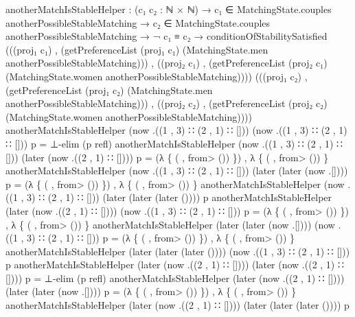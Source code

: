 \documentclass{article}
\begin{document}
\begin{code}
{anotherMatchIsStableHelper : (c₁ c₂ : ℕ × ℕ) →
      c₁ ∈ MatchingState.couples anotherPossibleStableMatching →
      c₂ ∈ MatchingState.couples anotherPossibleStableMatching →
      ¬ c₁ ≡ c₂ →
      conditionOfStabilitySatisfied
      (((proj₁ c₁) , (getPreferenceList (proj₁ c₁) (MatchingState.men anotherPossibleStableMatching))) , ((proj₂ c₁) , (getPreferenceList (proj₂ c₁) (MatchingState.women anotherPossibleStableMatching))))
      (((proj₁ c₂) , (getPreferenceList (proj₁ c₂) (MatchingState.men anotherPossibleStableMatching))) , ((proj₂ c₂) , (getPreferenceList (proj₂ c₂) (MatchingState.women anotherPossibleStableMatching))))
anotherMatchIsStableHelper \AgdaUnderscore{} \AgdaUnderscore{} (now .((1 , 3) ∷ (2 , 1) ∷ [])) (now .((1 , 3) ∷ (2 , 1) ∷ [])) p = ⊥-elim (p refl)
anotherMatchIsStableHelper \AgdaUnderscore{} \AgdaUnderscore{} (now .((1 , 3) ∷ (2 , 1) ∷ [])) (later (now .((2 , 1) ∷ []))) p = (λ \{ (\AgdaUnderscore{} , \AgdaUnderscore{}from>\AgdaUnderscore{} ()) \}) , λ \{ (\AgdaUnderscore{} , \AgdaUnderscore{}from>\AgdaUnderscore{} ()) \}
anotherMatchIsStableHelper \AgdaUnderscore{} \AgdaUnderscore{} (now .((1 , 3) ∷ (2 , 1) ∷ [])) (later (later (now .[]))) p = (λ \{ (\AgdaUnderscore{} , \AgdaUnderscore{}from>\AgdaUnderscore{} ()) \}) , λ \{ (\AgdaUnderscore{} , \AgdaUnderscore{}from>\AgdaUnderscore{} ()) \}
anotherMatchIsStableHelper \AgdaUnderscore{} \AgdaUnderscore{} (now .((1 , 3) ∷ (2 , 1) ∷ [])) (later (later (later ()))) p
anotherMatchIsStableHelper \AgdaUnderscore{} \AgdaUnderscore{} (later (now .((2 , 1) ∷ []))) (now .((1 , 3) ∷ (2 , 1) ∷ [])) p = (λ \{ (\AgdaUnderscore{} , \AgdaUnderscore{}from>\AgdaUnderscore{} ()) \}) , λ \{ (\AgdaUnderscore{} , \AgdaUnderscore{}from>\AgdaUnderscore{} ()) \} 
anotherMatchIsStableHelper \AgdaUnderscore{} \AgdaUnderscore{} (later (later (now .[]))) (now .((1 , 3) ∷ (2 , 1) ∷ [])) p = (λ \{ (\AgdaUnderscore{} , \AgdaUnderscore{}from>\AgdaUnderscore{} ()) \}) , λ \{ (\AgdaUnderscore{} , \AgdaUnderscore{}from>\AgdaUnderscore{} ()) \}
anotherMatchIsStableHelper \AgdaUnderscore{} \AgdaUnderscore{} (later (later (later ()))) (now .((1 , 3) ∷ (2 , 1) ∷ [])) p
anotherMatchIsStableHelper \AgdaUnderscore{} \AgdaUnderscore{} (later (now .((2 , 1) ∷ []))) (later (now .((2 , 1) ∷ []))) p = ⊥-elim (p refl)
anotherMatchIsStableHelper \AgdaUnderscore{} \AgdaUnderscore{} (later (now .((2 , 1) ∷ []))) (later (later (now .[]))) p = (λ \{ (\AgdaUnderscore{} , \AgdaUnderscore{}from>\AgdaUnderscore{} ()) \}) , λ \{ (\AgdaUnderscore{} , \AgdaUnderscore{}from>\AgdaUnderscore{} ()) \}
anotherMatchIsStableHelper \AgdaUnderscore{} \AgdaUnderscore{} (later (now .((2 , 1) ∷ []))) (later (later (later ()))) p
}
\end{code}
\end{document}
